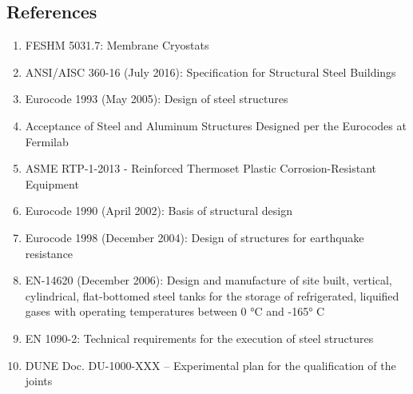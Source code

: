 \subsection{References}
\label{sec:cryost-construc-ref}

\begin{enumerate}
\item FESHM 5031.7: Membrane Cryostats
\item ANSI/AISC 360-16 (July 2016): Specification for Structural Steel Buildings
\item Eurocode 1993 (May 2005): Design of steel structures
\item Acceptance of Steel and Aluminum Structures Designed per the Eurocodes at Fermilab
\item ASME RTP-1-2013 - Reinforced Thermoset Plastic Corrosion-Resistant Equipment
\item Eurocode 1990 (April 2002): Basis of structural design
\item Eurocode 1998 (December 2004): Design of structures for earthquake resistance
\item EN-14620 (December 2006): Design and manufacture of site built, vertical, cylindrical, flat-bottomed steel tanks for the storage of refrigerated, liquified gases with operating temperatures between 0 °C and -165° C
\item EN 1090-2: Technical requirements for the execution of steel structures
\item DUNE Doc. DU-1000-XXX – Experimental plan for the qualification of the joints
\end{enumerate}



